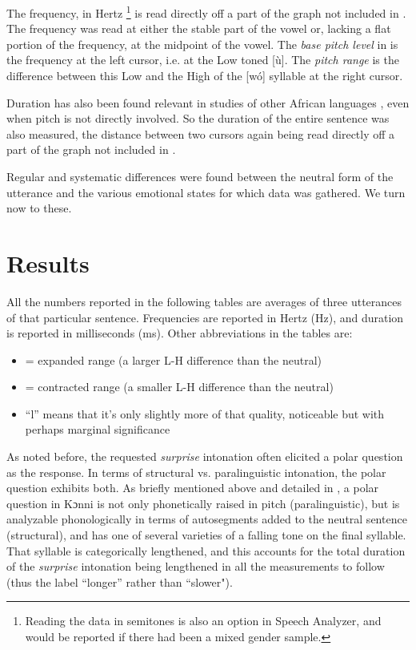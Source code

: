 \documentclass[output=paper]{langsci/langscibook}
\begin{document}
The frequency, in Hertz \footnote{Reading the data in semitones is also an option in Speech Analyzer, and would be reported if there had been a mixed gender sample.} is read directly off a part of the graph not included in . The frequency was read at either the stable part of the vowel or, lacking a flat portion of the frequency, at the midpoint of the vowel.  The \emph{base pitch level} in  is the frequency at the left cursor, i.e. at the Low toned [ù]. The \emph{pitch range} is the difference between this Low and the High of the [wó] syllable at the right cursor. 

Duration has also been found relevant in studies of other African languages \citep{hymanmonaka2011,fiedlerjannedy2013}, even when pitch is not directly involved. So the duration of the entire sentence was also measured, the distance between two cursors again being read directly off a part of the graph not included in .

Regular and systematic differences were found between the neutral form of the utterance and the various emotional states for which data was gathered. We turn now to these. 

\section{Results} 
All the numbers reported in the following tables are averages of three utterances of that particular sentence. Frequencies are reported in Hertz (Hz), and duration is reported in milliseconds (ms). Other abbreviations in the tables are: 

\begin{itemize}[noitemsep]
\item \EXP = expanded range (a larger L-H difference than the neutral)
\item \CONT = contracted range (a smaller L-H difference than the neutral)
\item ``l'' means that it's only slightly more of that quality, noticeable but with perhaps marginal significance 
\end{itemize}

As noted before, the requested \emph{surprise} intonation often elicited a polar question as the response. In terms of structural vs. paralinguistic intonation, the polar question exhibits both. As briefly mentioned above and detailed in \citet{cahill2012}, a polar question in Kɔnni is not only phonetically raised in pitch (paralinguistic), but is analyzable phonologically in terms of autosegments added to the neutral sentence (structural), and has one of several varieties of a falling tone on the final syllable. That syllable is categorically lengthened, and this accounts for the total duration of the \emph{surprise} intonation being lengthened in all the measurements to follow (thus the label ``longer'' rather than ``slower").
\end{document}
